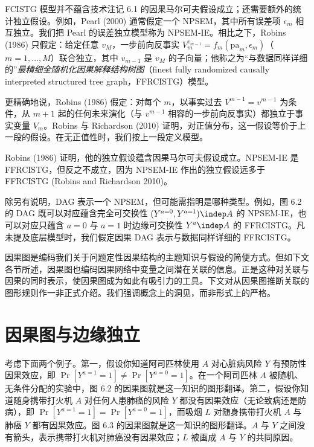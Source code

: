 \begin{techpoint}[与反事实模型相联系的独立性]
FCISTG 模型并不蕴含技术注记 6.1 的因果马尔可夫假设成立；还需要额外的统计独立假设。例如，Pearl (2000) 通常假定一个 NPSEM，其中所有误差项 $\epsilon_m$ 相互独立。我们把 Pearl 的误差独立模型称为 NPSEM-IE。相比之下，Robins (1986) 只假定：给定任意 $v_M$，一步前向反事实 $V_m^{v_{m-1}}=f_m(\mathrm{pa}_m,\epsilon_m)$（$m=1,\ldots,M$）联合独立，其中 $v_{m-1}$ 是 $v_M$ 的子向量；他称之为“与数据同样详细的”\emph{最精细全随机化因果解释结构树图}（finest fully randomized causally interpreted structured tree graph，FFRCISTG）模型。

更精确地说，Robins (1986) 假定：对每个 $m$，以事实过去 $V^{m-1}=v^{m-1}$ 为条件，从 $m+1$ 起的任何未来演化（与 $v^{m-1}$ 相容的一步前向反事实）都独立于事实变量 $V_m$。Robins 与 Richardson (2010) 证明，对正值分布，这一假设等价于上一段的假设。在无正值性时，我们按上一段定义模型。

Robins (1986) 证明，他的独立假设蕴含因果马尔可夫假设成立。NPSEM-IE 是 FFRCISTG，但反之不成立，因为 NPSEM-IE 作出的独立假设远多于 FFRCISTG (Robins and Richardson 2010)。

除另有说明，DAG 表示一个 NPSEM，但可能需指明是哪种类型。例如，图 6.2 的 DAG 既可以对应蕴含完全可交换性 $(Y^{a=0},Y^{a=1})\indep A$ 的 NPSEM-IE，也可以对应只蕴含 $a=0$ 与 $a=1$ 时边缘可交换性 $Y^{a}\indep A$ 的 FFRCISTG。凡未提及底层模型时，我们假定因果 DAG 表示与数据同样详细的 FFRCISTG。
\end{techpoint}

因果图是编码我们关于问题定性因果结构的主题知识与假设的简便方式。但如下文各节所述，因果图也编码因果网络中变量之间潜在关联的信息。正是这种对关联与因果的同时表示，使因果图成为如此有吸引力的工具。下文对从因果图推断关联的图形规则作一非正式介绍。我们强调概念上的洞见，而非形式上的严格。

\section{因果图与边缘独立}

考虑下面两个例子。第一，假设你知道阿司匹林使用 $A$ 对心脏病风险 $Y$ 有预防性因果效应，即 $\Pr[Y^{a=1}=1]\neq\Pr[Y^{a=0}=1]$。在一个阿司匹林 $A$ 被随机、无条件分配的实验中，图 6.2 的因果图就是这一知识的图形翻译。第二，假设你知道随身携带打火机 $A$ 对任何人患肺癌的风险 $Y$ 都没有因果效应（无论致病还是防病），即 $\Pr[Y^{a=1}=1]=\Pr[Y^{a=0}=1]$，而吸烟 $L$ 对随身携带打火机 $A$ 与肺癌 $Y$ 都有因果效应。图 6.3 的因果图就是这一知识的图形翻译。$A$ 与 $Y$ 之间没有箭头，表示携带打火机对肺癌没有因果效应；$L$ 被画成 $A$ 与 $Y$ 的共同原因。

